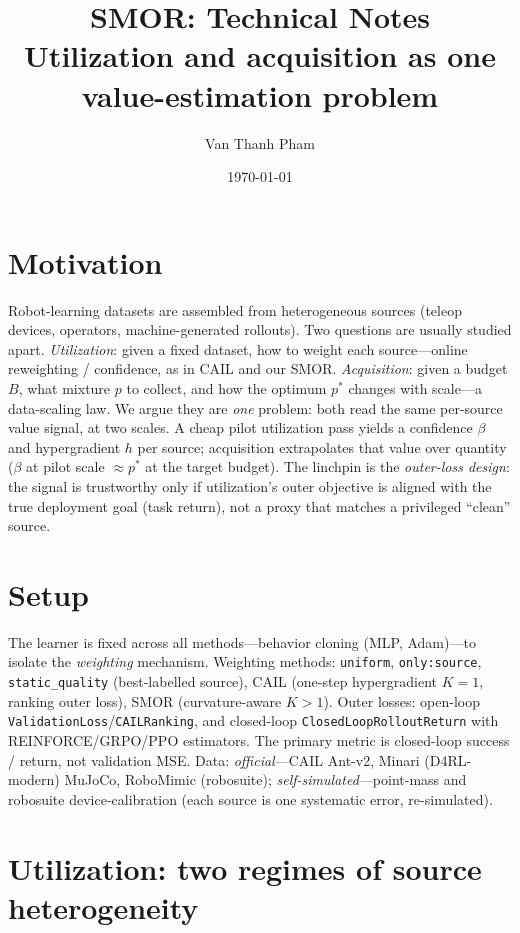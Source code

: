 \documentclass[11pt]{article}
\title{\textbf{SMOR: Technical Notes}\\[2pt]
\large Utilization and acquisition as one value-estimation problem}
\author{Van Thanh Pham}
\date{\today}
\begin{document}
\maketitle
\vspace{-2.2em}

\section{Motivation}
Robot-learning datasets are assembled from heterogeneous sources (teleop devices, operators,
machine-generated rollouts). Two questions are usually studied apart. \emph{Utilization}: given a
fixed dataset, how to weight each source---online reweighting / confidence, as in CAIL and
our SMOR. \emph{Acquisition}: given a budget $B$, what mixture $p$ to collect, and
how the optimum $p^\ast$ changes with scale---a data-scaling law. We argue they are \emph{one}
problem: both read the same per-source value signal, at two scales. A cheap pilot utilization pass
yields a confidence $\beta$ and hypergradient $h$ per source; acquisition extrapolates that value
over quantity ($\beta$ at pilot scale $\approx p^\ast$ at the target budget). The linchpin is the
\emph{outer-loss design}: the signal is trustworthy only if utilization's outer objective is
aligned with the true deployment goal (task return), not a proxy that matches a privileged
``clean'' source.

\section{Setup}
The learner is fixed across all methods---behavior cloning (MLP, Adam)---to isolate the
\emph{weighting} mechanism. Weighting methods: \texttt{uniform}, \texttt{only:source},
\texttt{static\_quality} (best-labelled source), CAIL (one-step hypergradient $K{=}1$,
ranking outer loss), SMOR (curvature-aware $K{>}1$). Outer losses: open-loop
\texttt{ValidationLoss}/\texttt{CAILRanking}, and closed-loop \texttt{ClosedLoopRolloutReturn} with
REINFORCE/GRPO/PPO estimators. The primary metric is closed-loop success / return,
not validation MSE. Data: \emph{official}---CAIL Ant-v2, Minari (D4RL-modern) MuJoCo, RoboMimic
(robosuite); \emph{self-simulated}---point-mass and robosuite device-calibration (each source is one
systematic error, re-simulated).

\section{Utilization: two regimes of source heterogeneity}
\end{document}
